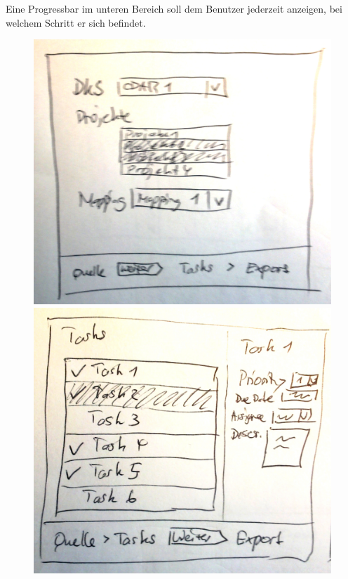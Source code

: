 	Eine Progressbar im unteren Bereich soll dem Benutzer jederzeit anzeigen, bei welchem Schritt er sich befindet.
	
	\begin{figure}[H]
		\begin{minipage}[b]{0.32\linewidth}
			\includegraphics[width=\linewidth]{interfacesAndProtocols/media/img/export1.jpg}
		\end{minipage}
		\begin{minipage}[b]{0.30\linewidth}
			\includegraphics[width=\linewidth]{interfacesAndProtocols/media/img/export2.jpg}

\end{minipage}
\end{figure}
